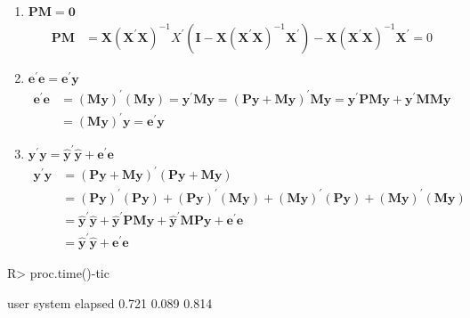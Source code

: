 \documentclass[11pt,reqno]{article}   %
\newcommand{\mlt}[1]{\mathbf{#1}} %
\newcommand{\kt}{^{\prime}}
\newcommand{\kX}{\mlt{X}}
\newcommand{\kM}{\mlt{M}}
\newcommand{\kP}{\mlt{P}}
\newcommand{\ky}{\mlt{y}}
\newcommand{\ke}{\mlt{e}}
\begin{document}
\begin{enumerate}
\item $\kP\kM=\mlt{0}$
  \begin{align*}
  \kP\kM & = \kX(\kX\kt\kX)^{-1}X\kt(\mlt{I}-\kX(\kX\kt\kX)^{-1}\kX\kt) - \kX(\kX\kt\kX)^{-1}\kX\kt = 0
  \end{align*}

\item $\ke\kt\ke = \ke\kt\ky$
  \begin{align*}
  \ke\kt\ke & = (\kM\ky)\kt(\kM\ky) = \ky\kt\kM\ky = (\kP\ky+\kM\ky)\kt\kM\ky = \ky\kt\kP\kM\ky + \ky\kt\kM\kM\ky \\ & = (\kM\ky)\kt\ky = \ke\kt\ky
  \end{align*}

\item $\ky\kt\ky=\hat{\ky}\kt\hat{\ky}+ \ke\kt\ke$
  \begin{align*}
  \ky\kt\ky & =(\kP\ky + \kM\ky)\kt(\kP\ky + \kM\ky) \\ & = (\kP\ky)\kt(\kP\ky) + (\kP\ky)\kt(\kM\ky) + (\kM\ky)\kt(\kP\ky) + (\kM\ky)\kt(\kM\ky) \\ & = \hat{\ky}\kt\hat{\ky} + \hat{\ky}\kt\kP\kM\ky + \hat{\ky}\kt\kM\kP\ky + \ke\kt\ke \\ & = \hat{\ky}\kt\hat{\ky}+ \ke\kt\ke
  \end{align*}
\end{enumerate}






\begin{Schunk}
\begin{Sinput}
R> proc.time()-tic
\end{Sinput}
\begin{Soutput}
   user  system elapsed 
  0.721   0.089   0.814 
\end{Soutput}
\end{Schunk}
\end{document}
